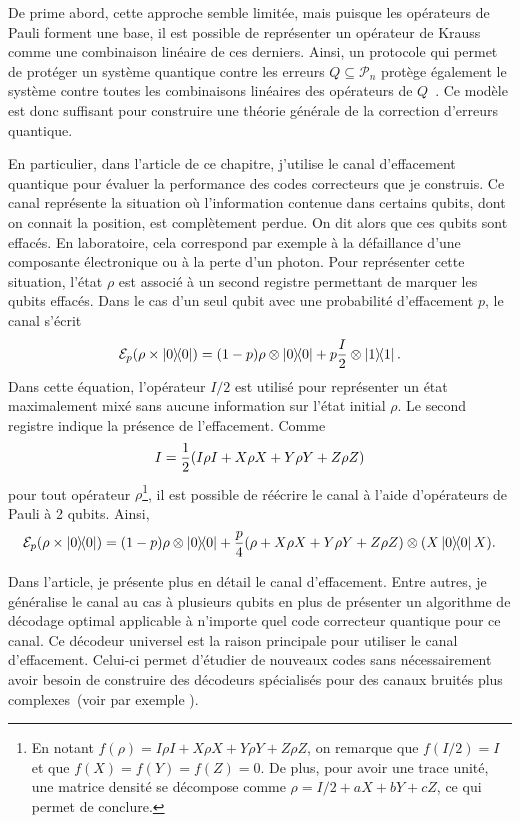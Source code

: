 De prime abord,
cette approche semble limitée,
mais puisque les opérateurs de Pauli forment une base,
il est possible de représenter un opérateur de Krauss
comme une combinaison linéaire de ces derniers.
Ainsi,
un protocole qui permet de protéger un système quantique contre les erreurs 
$Q \subseteq \mathcal P_n$ protège également le système contre toutes les 
combinaisons linéaires des opérateurs de $Q$~\cite{knill_theory_1997}.
Ce modèle est donc suffisant pour construire une théorie générale de la correction d'erreurs quantique.

En particulier,
dans l'article de ce chapitre,
j'utilise le canal d'effacement quantique pour évaluer la performance
des codes correcteurs que je construis.
Ce canal représente la situation où l'information contenue dans certains qubits,
dont on connait la position, est complètement perdue.
On dit alors que ces qubits sont effacés.
En laboratoire, cela correspond par exemple à la défaillance d'une composante électronique
ou à la perte d'un photon.
Pour représenter cette situation, l'état $\rho$ est associé à un second registre
permettant de marquer les qubits effacés.
Dans le cas d'un seul qubit avec une probabilité d'effacement $p$,
le canal s'écrit
\begin{equation}
  \mathcal E_p(\rho \times \op{0}) 
  = (1 - p) \rho \otimes \op{0} + p \frac{I}{2} \otimes \op{1}.
\end{equation}
Dans cette équation,
l'opérateur $I/2$ est utilisé pour représenter un état maximalement mixé
sans aucune information sur l'état initial $\rho$.
Le second registre indique la présence de l'effacement.
Comme 
\begin{align}
  I = \frac{1}{2} \qty(
  I\rho I + X \rho X + Y \rho Y + Z \rho Z
)
\end{align}
pour tout opérateur $\rho$\footnote{
  En notant $f(\rho) = I\rho I + X\rho X + Y \rho Y + Z \rho Z$,
  on remarque que $f(I/2) = I$ et que $f(X) = f(Y) = f(Z) = 0$.
  De plus,
  pour avoir une trace unité,
  une matrice densité se décompose comme $\rho = I/2 + aX + bY + cZ$,
  ce qui permet de conclure.
},
il est possible de réécrire le canal à l'aide d'opérateurs de Pauli à 2 qubits.
Ainsi,
\begin{equation}
  \mathcal E_p(\rho \times \op{0}) 
  = \qty(1 -  p) \rho \otimes \op{0} + \frac{p}{4} \qty(\rho + X \rho X + Y \rho Y + Z \rho Z)\otimes \qty(X\op{0}X).
\end{equation}

Dans l'article,
je présente plus en détail le canal d'effacement.
Entre autres,
je généralise le canal au cas à plusieurs qubits
en plus de présenter un algorithme de décodage optimal applicable à n'importe quel
code correcteur quantique pour ce canal.
Ce décodeur universel est la raison principale pour utiliser le canal d'effacement.
Celui-ci permet d'étudier de nouveaux codes sans nécessairement avoir besoin de construire des 
décodeurs spécialisés pour des canaux bruités plus complexes~(voir par exemple \cite{pastawski_holographic_2015, gullans_quantum_2021}).

